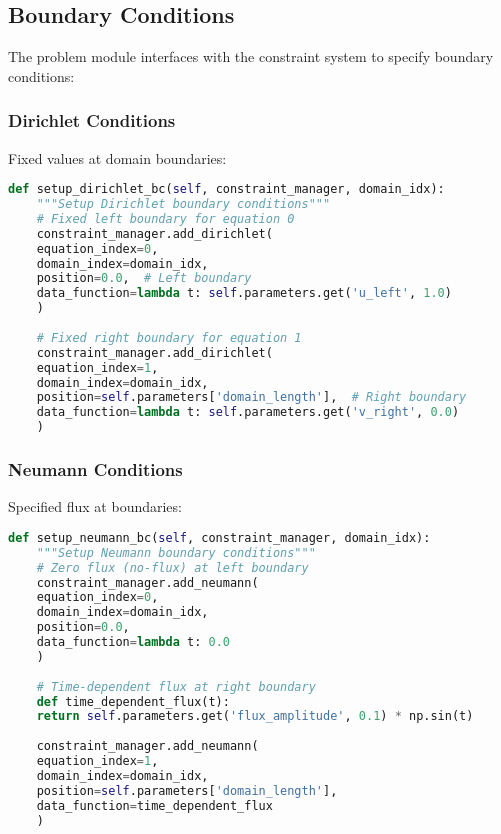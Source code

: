 \subsection{Boundary Conditions}
\label{subsec:boundary_conditions}

The problem module interfaces with the constraint system to specify boundary conditions:

\subsubsection{Dirichlet Conditions}

Fixed values at domain boundaries:

\begin{lstlisting}[language=Python, caption=Dirichlet Boundary Conditions]
	def setup_dirichlet_bc(self, constraint_manager, domain_idx):
	"""Setup Dirichlet boundary conditions"""
	# Fixed left boundary for equation 0
	constraint_manager.add_dirichlet(
	equation_index=0,
	domain_index=domain_idx, 
	position=0.0,  # Left boundary
	data_function=lambda t: self.parameters.get('u_left', 1.0)
	)
	
	# Fixed right boundary for equation 1
	constraint_manager.add_dirichlet(
	equation_index=1,
	domain_index=domain_idx,
	position=self.parameters['domain_length'],  # Right boundary
	data_function=lambda t: self.parameters.get('v_right', 0.0)
	)
\end{lstlisting}

\subsubsection{Neumann Conditions}

Specified flux at boundaries:

\begin{lstlisting}[language=Python, caption=Neumann Boundary Conditions]
	def setup_neumann_bc(self, constraint_manager, domain_idx):
	"""Setup Neumann boundary conditions"""
	# Zero flux (no-flux) at left boundary
	constraint_manager.add_neumann(
	equation_index=0,
	domain_index=domain_idx,
	position=0.0,
	data_function=lambda t: 0.0
	)
	
	# Time-dependent flux at right boundary
	def time_dependent_flux(t):
	return self.parameters.get('flux_amplitude', 0.1) * np.sin(t)
	
	constraint_manager.add_neumann(
	equation_index=1,
	domain_index=domain_idx,
	position=self.parameters['domain_length'],
	data_function=time_dependent_flux
	)
\end{lstlisting}

